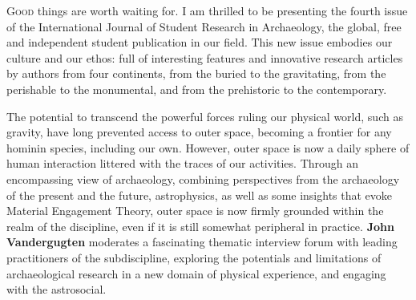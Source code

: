 \def\IJSRAidentifier{\currfilebase} %
\def\shorttitle{Issue Presentation}
\def\maintitle{Presentation of the fourth issue of IJSRA}
\def\cmail{gonzalo.linaresmatas@st-hughs.ox.ac.uk}
\def\authorone{Gonzalo Linares Matás}
\def\bioone{\href{https://oxford.academia.edu/GonzaloLinaresMatás}{\authorone}   is reading for an MSt in Landscape Archaeology and Molecular Bioarchaeology at St Hugh’s College, University of Oxford (UK). His research focuses on vertebrate taphonomy, with a special emphasis on canids, and Pleistocene zooarchaeology. He was the former President of the Oxford University Archaeology Society (Michaelmas 2015) and was invited to join the WAC (World Archaeology Congress) Student Committee (2017).

He is also particularly interested in the socio-political contexts of heritage management and ownership, contemporary archaeological theory, and the histories of the academic disciplines of archaeology and anthropology as practical modes of inquiry. Gonzalo is convinced that more efforts are needed to transform the academic publishing landscape.}
\def\affilone{Executive Editor, International Journal of Student Research in Archaeology
\\St Hugh’s College, University of Oxford}


\IJSRAopening%
\lettrine{G}{ood} things are worth waiting for. I am thrilled to be presenting the fourth issue of the International Journal of Student Research in Archaeology, the global, free and independent student publication in our field. This new issue embodies our culture and our ethos: full of interesting features and innovative research articles by authors from four continents, from the buried to the gravitating, from the perishable to the monumental, and from the prehistoric to the contemporary.

The potential to transcend the powerful forces ruling our physical world, such as gravity, have long prevented access to outer space, becoming a frontier for any hominin species, including our own. However, outer space is now a daily sphere of human interaction littered with the traces of our activities. Through an encompassing view of archaeology, combining perspectives from the archaeology of the present and the future, astrophysics, as well as some insights that evoke Material Engagement Theory, outer space is now firmly grounded within the realm of the discipline, even if it is still somewhat peripheral in practice. \textbf{John Vandergugten} moderates a fascinating thematic interview forum with leading practitioners of the subdiscipline, exploring the potentials and limitations of archaeological research in a new domain of physical experience, and engaging with the astrosocial.

